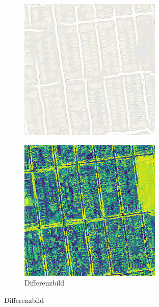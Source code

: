 \begin{figure}[ht]
\begin{subfigure}[t]{.14\textwidth}
    \includegraphics[width=\linewidth]{images/cycleGanResults/Maps19Ld120_E100_Lr0002.jpg}
  \end{subfigure}
  \begin{subfigure}[t]{.14\textwidth}
    \centering
    \caption*{Differenzbild}
    \includegraphics[width=\linewidth]{images/cycleGanResults/Maps9_diff.png}

\end{subfigure}
\end{figure}
